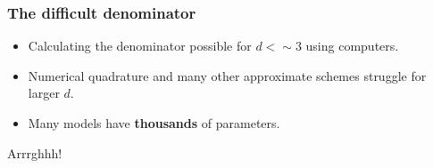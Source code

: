 \documentclass{beamer}
\begin{document}
\begin{frame}
	\frametitle{The difficult denominator}
	
	\begin{itemize}
		\item<2-> Calculating the denominator possible for $d < \sim 3$ using computers.
		\item<3-> Numerical quadrature and many other approximate schemes struggle for larger $d$.
		\item<4-> Many models have \textbf{thousands} of parameters.
	\end{itemize}
	
	\Large Arrrghhh!
	
\end{frame}

%
%
%
%
%	
\end{document}
